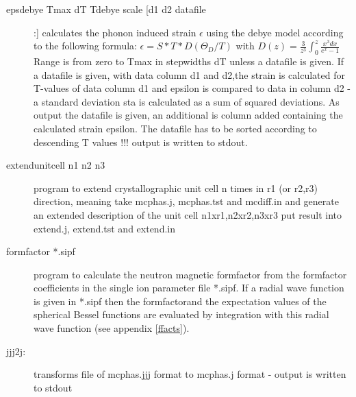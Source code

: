\begin{description}
\item [\prg epsdebye Tmax dT Tdebye scale [d1 d2 datafile]:]	        
		    calculates the phonon induced strain $\epsilon$ using the debye model
		    according to the following formula:
		    $   \epsilon=S*T*D(\Theta_{D}/T) $
				    with    
		    $D(z)=\frac{3}{z^3}\int_0^z \frac{x^3 dx}{e^x-1}$
                 Range is from zero to Tmax in stepwidths dT
		 unless a datafile is given. 
                 If a  datafile is given, with data column d1 and d2,the strain
                 is calculated for T-values of data column d1 and epsilon
		  is compared to data in column d2 - a standard 
                 deviation sta is calculated as a sum of squared deviations.
                 As output the datafile is given, an additional is column added 
		 containing the calculated strain epsilon. The datafile has to
		 be sorted according to descending T values !!!
                 output is written to stdout.

\item [\prg extendunitcell n1 n2 n3]program to extend crystallographic %
unit cell n 
                times in r1 (or r2,r3) direction, meaning take mcphas.j, mcphas.tst 
                and mcdiff.in and generate an extended description of the unit %
cell 
                n1xr1,n2xr2,n3xr3 put result into extend.j, extend.tst and extend.in

\item[\prg formfactor *.sipf] program to calculate the neutron magnetic formfactor
from the formfactor coefficients in the single ion parameter file *.sipf. If a radial wave function is given in *.sipf
then the formfactorand the expectation values of the spherical Bessel functions  are evaluated by integration
with this radial wave function (see appendix \ref{ffacts}).
\item [\prg jjj2j:] transforms file of {\prg mcphas.jjj} format to {\prg %
mcphas.j} format
- output is written to stdout


\end{description}
